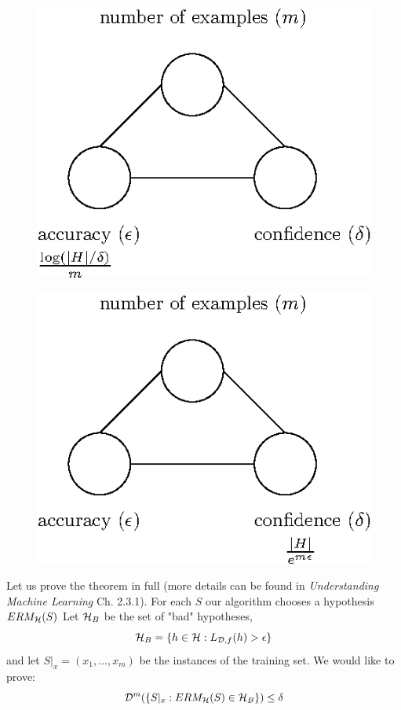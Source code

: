   \begin{figure}[h!]
 \centering\includegraphics[scale=0.8]{connection_m_eps_delta_finite2.eps}
 \end{figure}


  \begin{figure}[h!]
 \centering\includegraphics[scale=0.8]{connection_m_eps_delta_finite3.eps}
 \end{figure}

Let us prove the theorem in full (more details can be found in \textit{Understanding Machine Learning} Ch. 2.3.1). For each $S$ our algorithm chooses a hypothesis $ERM_{\mathcal{H}}(S)$
Let $\mathcal{H}_B$ be the set of "bad" hypotheses,
 \[ \mathcal{H}_B = \{h \in \mathcal{H} : L_{\mathcal{D},f}(h) > \epsilon\} \]
and let $S|_x = (x_1,\ldots,x_m)$ be the instances of the training set. We would like to prove:
\[
\mathcal{D}^m(\{ S|_x : ERM_{\mathcal{H}}(S)\in \mathcal{H}_B \})  \le \delta
\]

